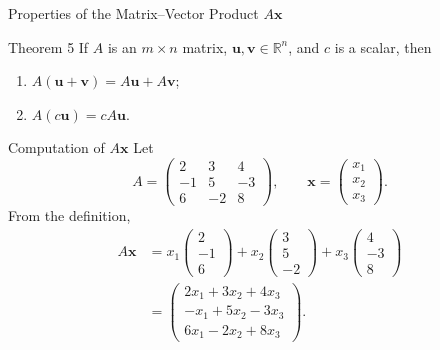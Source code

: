 \begin{frame}{Properties of the Matrix--Vector Product $A\mathbf{x}$}
  \begin{block}{Theorem 5}
    If $A$ is an $m\times n$ matrix,
    $\mathbf{u},\mathbf{v}\in\mathbb{R}^n$, and $c$ is a scalar, then
    \begin{enumerate}
      \item $A(\mathbf{u}+\mathbf{v})=A\mathbf{u}+A\mathbf{v}$;
      \item $A(c\mathbf{u})=cA\mathbf{u}$.
    \end{enumerate}
  \end{block}
\end{frame}

\begin{frame}{Computation of $A\mathbf{x}$}
  Let
  \[
    A=\begin{pmatrix}2&3&4\\-1&5&-3\\6&-2&8\end{pmatrix},\qquad
    \mathbf{x}=\begin{pmatrix}x_1\\x_2\\x_3\end{pmatrix}.
  \]
  From the definition,
  \begin{align*}
    A\mathbf{x}
      &=x_1\begin{pmatrix}2\\-1\\6\end{pmatrix}
       +x_2\begin{pmatrix}3\\5\\-2\end{pmatrix}
       +x_3\begin{pmatrix}4\\-3\\8\end{pmatrix}\\
      &=\begin{pmatrix}
          2x_1+3x_2+4x_3\\
          -x_1+5x_2-3x_3\\
          6x_1-2x_2+8x_3
        \end{pmatrix}.
  \end{align*}
\end{frame}

